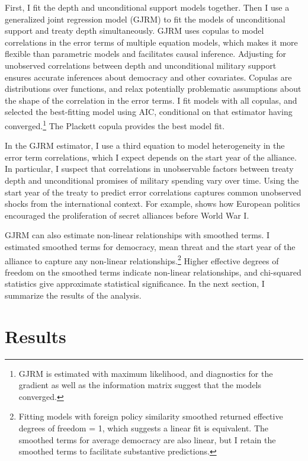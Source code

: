 \documentclass[12pt]{article}
\begin{document}
First, I fit the depth and unconditional support models together.
Then I use a generalized joint regression model (GJRM) \citep{Braumoelleretal2018} to fit the models of unconditional support and treaty depth simultaneously.
GJRM uses copulas to model correlations in the error terms of multiple equation models, which makes it more flexible than parametric models and facilitates causal inference. 
Adjusting for unobserved correlations between depth and unconditional military support ensures accurate inferences about democracy and other covariates. 
Copulas are distributions over functions, and relax potentially problematic assumptions about the shape of the correlation in the error terms. 
I fit models with all copulas, and selected the best-fitting model using AIC, conditional on that estimator having converged.\footnote{GJRM is estimated with maximum likelihood, and diagnostics for the gradient as well as the information matrix suggest that the models converged.} 
The Plackett copula provides the best model fit.


In the GJRM estimator, I use a third equation to model heterogeneity in the error term correlations, which I expect depends on the start year of the alliance. 
In particular, I suspect that correlations in unobservable factors between treaty depth and unconditional promises of military spending vary over time. 
Using the start year of the treaty to predict error correlations captures common unobserved shocks from the international context. 
For example, \citet{Kuo2019} shows how European politics encouraged the proliferation of secret alliances before World War I. 


GJRM can also estimate non-linear relationships with smoothed terms. 
I estimated smoothed terms for democracy, mean threat and the start year of the alliance to capture any non-linear relationships.\footnote{Fitting models with foreign policy similarity smoothed returned effective degrees of freedom = 1, which suggests a linear fit is equivalent. The smoothed terms for average democracy are also linear, but I retain the smoothed terms to facilitate substantive predictions.}  
Higher effective degrees of freedom on the smoothed terms indicate non-linear relationships, and chi-squared statistics give approximate statistical significance. 
In the next section, I summarize the results of the analysis. 



\section{Results}
\end{document}
